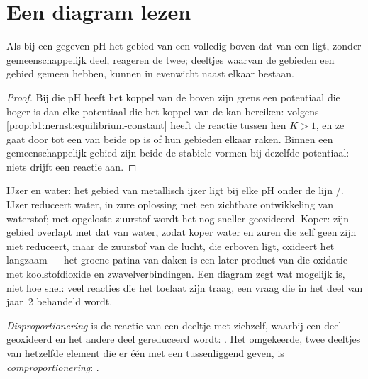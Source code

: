 \section{Een diagram lezen}\label{sec:b1:e-ph-diagrams:reading}

\begin{proposition}\label{prop:b1:e-ph-diagrams:disjoint-domains}
Als bij een gegeven pH het gebied van een  volledig boven dat van
een  ligt, zonder gemeenschappelijk deel, reageren de twee;
deeltjes waarvan de gebieden een gebied gemeen hebben, kunnen in
evenwicht naast elkaar bestaan.
\end{proposition}

\begin{proof}
Bij die pH heeft het koppel van de  boven zijn grens een
potentiaal die hoger is dan elke potentiaal die het koppel van de
 kan bereiken: volgens
\cref{prop:b1:nernst:equilibrium-constant} heeft de reactie tussen hen
$K > 1$, en ze gaat door tot een van beide op is of hun gebieden elkaar
raken. Binnen een gemeenschappelijk gebied zijn beide de stabiele vormen
bij dezelfde potentiaal: niets drijft een reactie aan.
\end{proof}

IJzer en water: het gebied van metallisch ijzer ligt bij elke pH onder de
lijn /. IJzer reduceert water, in zure oplossing met een
zichtbare ontwikkeling van waterstof; met opgeloste zuurstof wordt het
nog sneller geoxideerd. Koper: zijn gebied overlapt met dat van water,
zodat koper water en zuren die zelf geen  zijn niet reduceert,
maar de zuurstof van de lucht, die erboven ligt, oxideert het langzaam
--- het groene patina van daken is een later product van die oxidatie
met koolstofdioxide en zwavelverbindingen. Een diagram zegt wat mogelijk
is, niet hoe snel: veel reacties die het toelaat zijn traag, een vraag
die in het deel van jaar~2 behandeld wordt.

\begin{definition}\label{def:b1:e-ph-diagrams:disproportionation}
\emph{Disproportionering} is de reactie van een
deeltje met zichzelf, waarbij een deel geoxideerd en het andere deel
gereduceerd wordt: . Het omgekeerde, twee deeltjes
van hetzelfde element die er één met een tussenliggend 
geven, is
\emph{comproportionering}:
.
\end{definition}

